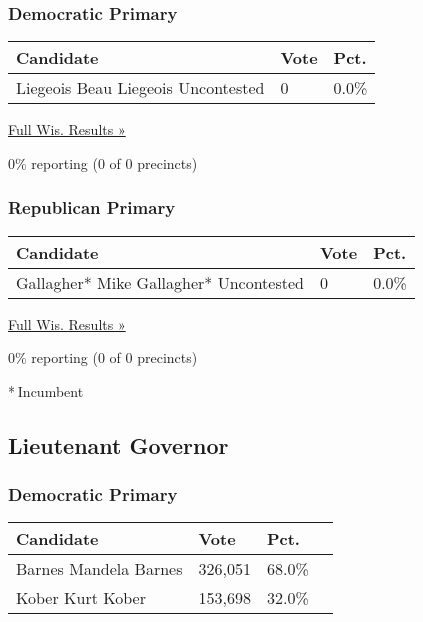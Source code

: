 \hypertarget{democratic-primary-9}{%
\subsubsection{Democratic Primary}\label{democratic-primary-9}}

\begin{longtable}[]{@{}lll@{}}
\toprule
Candidate & Vote & Pct.\tabularnewline
\midrule
\endhead
 Liegeois Beau Liegeois Uncontested & 0 & 0.0\%\tabularnewline
\bottomrule
\end{longtable}

\href{https://www.nytimes3xbfgragh.onion/elections/results/wisconsin}{Full
Wis. Results »}

0\% reporting (0 of 0 precincts)

\hypertarget{republican-primary-8}{%
\subsubsection{Republican Primary}\label{republican-primary-8}}

\begin{longtable}[]{@{}lll@{}}
\toprule
Candidate & Vote & Pct.\tabularnewline
\midrule
\endhead
 Gallagher* Mike Gallagher* Uncontested & 0 & 0.0\%\tabularnewline
\bottomrule
\end{longtable}

\href{https://www.nytimes3xbfgragh.onion/elections/results/wisconsin}{Full
Wis. Results »}

0\% reporting (0 of 0 precincts)

* Incumbent

\hypertarget{lieutenant-governor}{%
\subsection{Lieutenant Governor}\label{lieutenant-governor}}

\hypertarget{democratic-primary-10}{%
\subsubsection{Democratic Primary}\label{democratic-primary-10}}

\begin{longtable}[]{@{}llll@{}}
\toprule
Candidate & Vote & Pct. &\tabularnewline
\midrule
\endhead
 Barnes Mandela Barnes & 326,051 & 68.0\% &\tabularnewline
 Kober Kurt Kober & 153,698 & 32.0\% &\tabularnewline
\bottomrule
\end{longtable}

